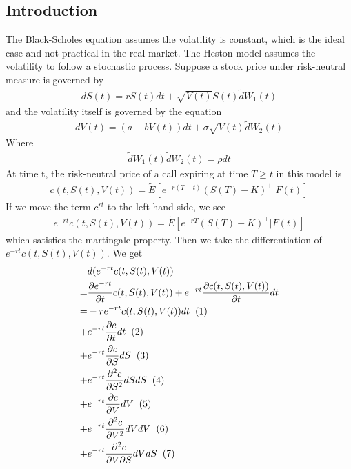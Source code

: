 \documentclass[a4paper]{article}
\begin{document}
\subsection{Introduction}
The Black-Scholes equation assumes the volatility is constant, which is the ideal case and not practical in the real market. The Heston model assumes the volatility to follow a stochastic process. Suppose a stock price under risk-neutral measure is governed by
\begin{align}
	dS(t) = rS(t)dt + \sqrt{V(t)} S(t) \tilde dW_1(t)
\end{align}
and the volatility itself is governed by the equation
\begin{align}
	dV(t) = (a -bV(t))dt + \sigma \sqrt{V(t)} \tilde dW_2(t)
\end{align}
Where 
\begin{align*}
	\tilde dW_1(t) \tilde dW_2(t) = \rho dt
\end{align*}
At time t, the risk-neutral price of a call expiring at time $T \geq t$ in this model is
\begin{align*}
	c(t, S(t), V(t)) = \tilde E[e^{-r(T-t)}(S(T)-K)^+|F(t)]
\end{align*}
If we move the term $c^{rt}$ to the left hand side, we see
\begin{align}
	e^{-rt}c(t, S(t), V(t)) = \tilde E[e^{-rT}(S(T)-K)^+|F(t)]
\end{align}
which satisfies the martingale property.
Then we take the differentiation of $e^{-rt}c(t, S(t), V(t))$. We get
\begin{align*}
	& d(e^{-rt}c(t, S(t), V(t))\\
	= & \frac{\partial e^{-rt}}{\partial t} c(t, S(t), V(t)) 
	+ e^{-rt}\frac{\partial c(t, S(t), V(t))}{\partial t} dt \\
	= & -re^{-rt}c(t, S(t),V(t))dt \hspace{2mm} (1)\\
	+ & e^{-rt} \frac{\partial c}{\partial t} dt \hspace{2mm} (2) \\
	+ & e^{-rt} \frac{\partial c}{\partial S} dS \hspace{2mm} (3) \\
	+ & e^{-rt} \frac{\partial^2 c}{\partial S^2} dS dS \hspace{2mm} (4)\\
	+ & e^{-rt} \frac{\partial c}{\partial V} dV \hspace{2mm} (5) \\
	+ & e^{-rt} \frac{\partial^2 c}{\partial V^2} dV dV\hspace{2mm} (6)\\
	+ & e^{-rt} \frac{\partial^2 c}{\partial V \partial S} dV dS\hspace{2mm} (7)
\end{align*}
\end{document}
